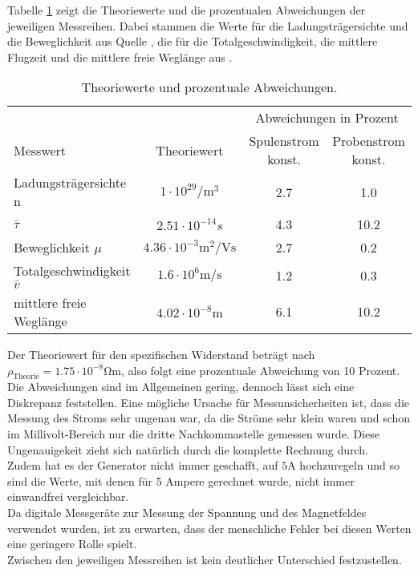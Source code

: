 Tabelle \ref{tab:theo} zeigt die Theoriewerte und die prozentualen Abweichungen 
der jeweiligen Messreihen. Dabei stammen die Werte für die Ladungsträgersichte und
die Beweglichkeit aus Quelle \cite{beweglichkeit}, die für die Totalgeschwindigkeit,
die mittlere Flugzeit und die mittlere freie Weglänge aus \cite{transport}. 
\begin{table}
 \centering
 \caption{Theoriewerte und prozentuale Abweichungen.}
 \label{tab:theo}
 \begin{tabular}{lccc}
  \toprule
   & & \multicolumn{2}{c}{Abweichungen in Prozent}\\
  \cmidrule(lr){3-4}
  Messwert & Theoriewert & Spulenstrom konst. & Probenstrom konst. \\
  \midrule
  Ladungsträgersichte n & $1 \cdot 10^{29} \si{\per\m\cubed}$ & 2.7 & 1.0\\
  $\bar{\tau}$ & $2.51 \cdot 10^{-14} \si{s}$ & 4.3 & 10.2\\
  Beweglichkeit $\mu$ & $4.36 \cdot 10^{-3} \si{\m\squared\per\volt\s}$ & 2.7 & 0.2 \\
  Totalgeschwindigkeit $\bar{v}$ & $1.6 \cdot 10^{6} \si{\m\per\s}$ & 1.2 & 0.3 \\
  mittlere freie Weglänge & $4.02 \cdot 10^{-8} \si{\m}$ & 6.1 & 10.2 \\
  \bottomrule
 \end{tabular}
\end{table}
\noindent Der Theoriewert für den spezifischen Widerstand beträgt nach \cite{spezid} 
$\rho_\text{Theorie} = 1.75 \cdot 10^{-8} \si{\ohm\m}$, also folgt eine prozentuale 
Abweichung von 10 Prozent.\\
Die Abweichungen sind im Allgemeinen gering, dennoch lässt sich eine Diskrepanz feststellen.
Eine mögliche Ursache für Messunsicherheiten ist, dass die Messung des Stroms sehr ungenau
war, da die Ströme sehr klein waren und schon im Millivolt-Bereich nur 
die dritte Nachkommastelle gemessen wurde. Diese Ungenauigekeit zieht sich
natürlich durch die komplette Rechnung durch.\\
Zudem hat es der Generator nicht immer geschafft, auf $5 \si{\A}$ hochzuregeln
und so sind die Werte, mit denen für 5 Ampere gerechnet wurde, nicht immer einwandfrei
vergleichbar. \\
Da digitale Messgeräte zur Messung der Spannung und des Magnetfeldes verwendet
wurden, ist zu erwarten, dass der menschliche Fehler bei diesen Werten eine geringere
Rolle spielt.\\
Zwischen den jeweiligen Messreihen ist kein deutlicher Unterschied festzustellen.